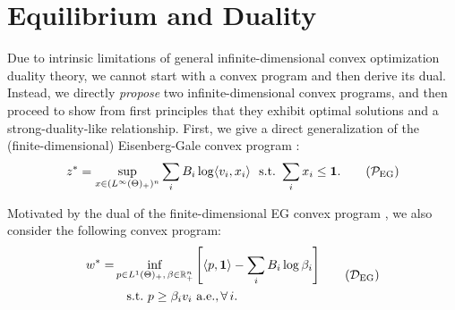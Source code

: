 
\section{Equilibrium and Duality} \label{sec:equi-and-dual}


Due to intrinsic limitations of general infinite-dimensional convex optimization duality theory, we cannot start with a convex program and then derive its dual.
Instead, we directly \emph{propose} two infinite-dimensional convex programs, and then proceed to show from first principles that they exhibit optimal solutions and a strong-duality-like relationship.
First, we give a direct generalization of the (finite-dimensional) Eisenberg-Gale convex program \citep{eisenberg1961aggregation,nisan2007algorithmic}:
\begin{align}
z^* = \sup_{x\in (L^\infty(\Theta)_+)^n} \sum_i B_i \log \langle v_i, x_i \rangle\ \ {\rm s.t.}\ \sum_i x_i \leq \ones. \tag{$\mathcal P_{\rm EG}$} \label{eq:eg-primal}
\end{align}

Motivated by the dual of the finite-dimensional EG convex program \cite[Lemma 3]{cole2017convex}, we also consider the following convex program:
\begin{align}
\begin{split}
w^* = & \inf_{p\in L^1(\Theta)_+,\, \beta\in \RR^n_+} \left[ \langle p, \ones \rangle - \sum_i B_i \log \beta_i\right] \\ & \quad {\rm s.t.} \ p \geq \beta_i v_i\ \almeve, \forall\,i. 
\end{split} \tag{$\mathcal D_{\rm EG}$}
\label{eq:eg-dual-beta-p}
\end{align}

